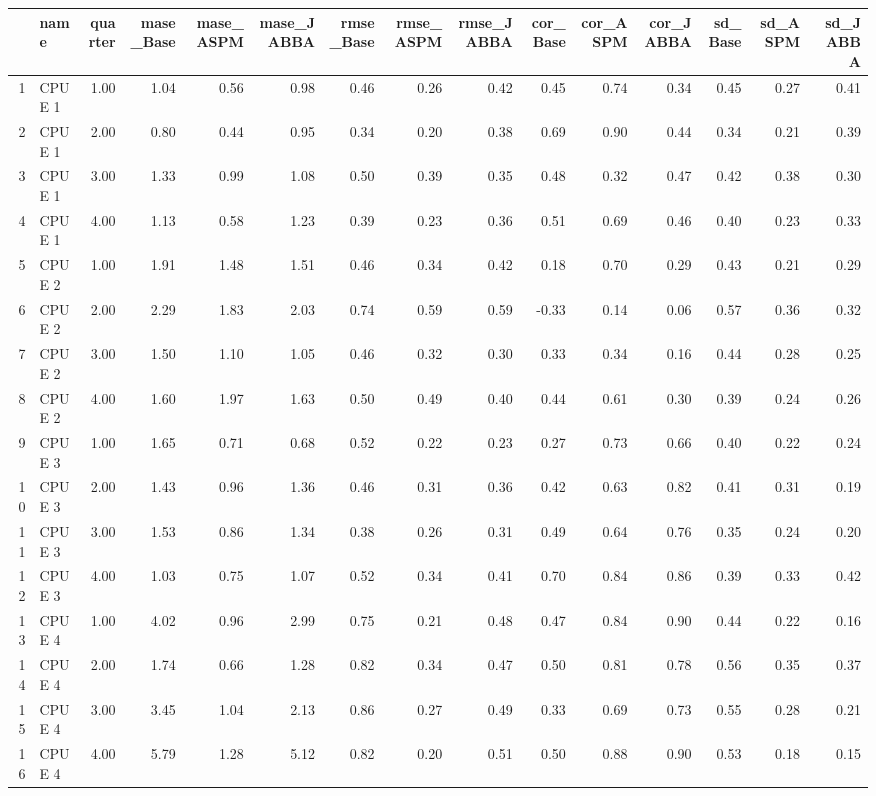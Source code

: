 \begin{table}[ht]
\centering
\begin{tabular}{rlrrrrrrrrrrrrr}
  \hline
 & name & quarter & mase\_Base & mase\_ASPM & mase\_JABBA & rmse\_Base & rmse\_ASPM & rmse\_JABBA & cor\_Base & cor\_ASPM & cor\_JABBA & sd\_Base & sd\_ASPM & sd\_JABBA \\ 
  \hline
1 & CPUE 1 & 1.00 & 1.04 & 0.56 & 0.98 & 0.46 & 0.26 & 0.42 & 0.45 & 0.74 & 0.34 & 0.45 & 0.27 & 0.41 \\ 
  2 & CPUE 1 & 2.00 & 0.80 & 0.44 & 0.95 & 0.34 & 0.20 & 0.38 & 0.69 & 0.90 & 0.44 & 0.34 & 0.21 & 0.39 \\ 
  3 & CPUE 1 & 3.00 & 1.33 & 0.99 & 1.08 & 0.50 & 0.39 & 0.35 & 0.48 & 0.32 & 0.47 & 0.42 & 0.38 & 0.30 \\ 
  4 & CPUE 1 & 4.00 & 1.13 & 0.58 & 1.23 & 0.39 & 0.23 & 0.36 & 0.51 & 0.69 & 0.46 & 0.40 & 0.23 & 0.33 \\ 
  5 & CPUE 2 & 1.00 & 1.91 & 1.48 & 1.51 & 0.46 & 0.34 & 0.42 & 0.18 & 0.70 & 0.29 & 0.43 & 0.21 & 0.29 \\ 
  6 & CPUE 2 & 2.00 & 2.29 & 1.83 & 2.03 & 0.74 & 0.59 & 0.59 & -0.33 & 0.14 & 0.06 & 0.57 & 0.36 & 0.32 \\ 
  7 & CPUE 2 & 3.00 & 1.50 & 1.10 & 1.05 & 0.46 & 0.32 & 0.30 & 0.33 & 0.34 & 0.16 & 0.44 & 0.28 & 0.25 \\ 
  8 & CPUE 2 & 4.00 & 1.60 & 1.97 & 1.63 & 0.50 & 0.49 & 0.40 & 0.44 & 0.61 & 0.30 & 0.39 & 0.24 & 0.26 \\ 
  9 & CPUE 3 & 1.00 & 1.65 & 0.71 & 0.68 & 0.52 & 0.22 & 0.23 & 0.27 & 0.73 & 0.66 & 0.40 & 0.22 & 0.24 \\ 
  10 & CPUE 3 & 2.00 & 1.43 & 0.96 & 1.36 & 0.46 & 0.31 & 0.36 & 0.42 & 0.63 & 0.82 & 0.41 & 0.31 & 0.19 \\ 
  11 & CPUE 3 & 3.00 & 1.53 & 0.86 & 1.34 & 0.38 & 0.26 & 0.31 & 0.49 & 0.64 & 0.76 & 0.35 & 0.24 & 0.20 \\ 
  12 & CPUE 3 & 4.00 & 1.03 & 0.75 & 1.07 & 0.52 & 0.34 & 0.41 & 0.70 & 0.84 & 0.86 & 0.39 & 0.33 & 0.42 \\ 
  13 & CPUE 4 & 1.00 & 4.02 & 0.96 & 2.99 & 0.75 & 0.21 & 0.48 & 0.47 & 0.84 & 0.90 & 0.44 & 0.22 & 0.16 \\ 
  14 & CPUE 4 & 2.00 & 1.74 & 0.66 & 1.28 & 0.82 & 0.34 & 0.47 & 0.50 & 0.81 & 0.78 & 0.56 & 0.35 & 0.37 \\ 
  15 & CPUE 4 & 3.00 & 3.45 & 1.04 & 2.13 & 0.86 & 0.27 & 0.49 & 0.33 & 0.69 & 0.73 & 0.55 & 0.28 & 0.21 \\ 
  16 & CPUE 4 & 4.00 & 5.79 & 1.28 & 5.12 & 0.82 & 0.20 & 0.51 & 0.50 & 0.88 & 0.90 & 0.53 & 0.18 & 0.15 \\ 
   \hline
\end{tabular}
\end{table}

